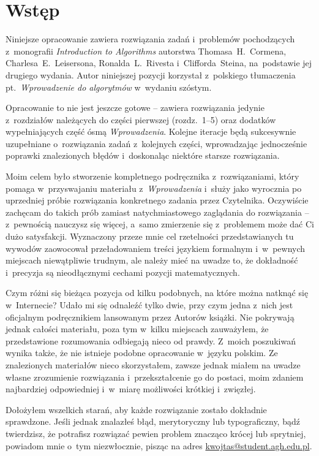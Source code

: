 \chapter{Wstęp}

Niniejsze opracowanie zawiera rozwiązania zadań i~problemów pochodzących z~monografii \textsl{Introduction to Algorithms} \cite{cormen} autorstwa Thomasa~H.~Cormena, Charlesa~E.~Leisersona, Ronalda~L.~Rivesta i~Clifforda~Steina, na~podstawie jej drugiego wydania. Autor niniejszej pozycji korzystał z~polskiego tłumaczenia pt.~\textsl{Wprowadzenie do algorytmów} \cite{cormenpl} w~wydaniu szóstym.

Opracowanie to nie jest jeszcze gotowe -- zawiera rozwiązania jedynie z~rozdziałów należących do części pierwszej (rozdz.~1\nobreakdash--5) oraz dodatków wypełniających część ósmą \textsl{Wprowadzenia}. Kolejne iteracje będą sukcesywnie uzupełniane o~rozwiązania zadań z~kolejnych części, wprowadzając jednocześnie poprawki znalezionych błędów i~doskonaląc niektóre starsze rozwiązania.

Moim celem było stworzenie kompletnego podręcznika z~rozwiązaniami, który pomaga w~przyswajaniu materiału z~\textsl{Wprowadzenia} i~służy jako wyrocznia po uprzedniej próbie rozwiązania konkretnego zadania przez Czytelnika. Oczywiście zachęcam do takich prób zamiast natychmiastowego zaglądania do rozwiązania -- z~pewnością nauczysz się więcej, a~samo zmierzenie się z~problemem może dać Ci dużo satysfakcji. Wyznaczony przeze mnie cel rzetelności przedstawianych tu wywodów zaowocował przeładowaniem treści językiem formalnym i~w~pewnych miejscach niewątpliwie trudnym, ale należy mieć na uwadze to, że dokładność i~precyzja są nieodłącznymi cechami pozycji matematycznych.

Czym różni się bieżąca pozycja od kilku podobnych, na które można natknąć się w~Internecie? Udało mi się odnaleźć tylko dwie, przy czym jedna z~nich jest oficjalnym podręcznikiem lansowanym przez Autorów książki. Nie pokrywają jednak całości materiału, poza tym w~kilku miejscach zauważyłem, że przedstawione rozumowania odbiegają nieco od prawdy. Z~moich poszukiwań wynika także, że nie istnieje podobne opracowanie w~języku polskim. Ze znalezionych materiałów nieco skorzystałem, zawsze jednak miałem na uwadze własne zrozumienie rozwiązania i~przekształcenie go do postaci, moim zdaniem najbardziej odpowiedniej i~w~miarę możliwości krótkiej i~zwięzłej.

Dołożyłem wszelkich starań, aby każde rozwiązanie zostało dokładnie sprawdzone. Jeśli jednak znalazłeś błąd, merytoryczny lub typograficzny, bądź twierdzisz, że potrafisz rozwiązać pewien problem znacząco krócej lub sprytniej, powiadom mnie o~tym niezwłocznie, pisząc na adres \url{kwojtas@student.agh.edu.pl}.

